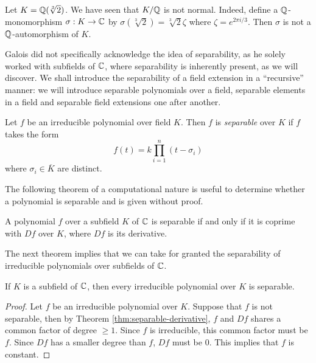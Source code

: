\begin{example}
	Let $K = \mathbb Q(\sqrt[3]{2})$. We have seen that $K / \mathbb Q$ is not normal. Indeed, define a $\mathbb Q$-monomorphism $\sigma : K \to \mathbb C$ by $\sigma(\sqrt[3]{2}) =  \sqrt[3]{2}\zeta $ where $\zeta = e^{2 \pi i / 3}$. Then $\sigma$ is not a $\mathbb Q$-automorphism of $K$. 
\end{example}



Galois did not specifically acknowledge the idea of separability, as he solely worked with subfields of $\mathbb C$, where separability is inherently present, as we will discover. We shall introduce the separability of a field extension in a ``recursive'' manner: we will introduce separable polynomials over a field, separable elements in a field and separable field extensions one after another. 

\begin{definition}
    Let $f$ be an irreducible polynomial over field $K$. Then $f$ is \textit{separable} over $K$ if $f$ takes the form 
    $$
        f(t) = k \prod_{i = 1} ^ n(t - \sigma_i)
    $$
    where $\sigma_i \in \overline K$ are distinct.
\end{definition}

The following theorem of a computational nature is useful to determine whether a polynomial is separable and is given without proof. 

\begin{theorem} \label{thm:separable-derivative}
    A polynomial $f$ over a subfield $K$ of $\mathbb C$ is separable if and only if it is coprime with $Df$ over $K$, where $Df$ is its derivative. 
\end{theorem}

The next theorem implies that we can take for granted the separability of irreducible polynomials over subfields of $\mathbb C$. 

\begin{theorem} \label{thm:separable-poly-in-C}
    If $K$ is a subfield of $\mathbb C$, then every irreducible polynomial over $K$ is separable. 
\end{theorem}

\begin{proof}
    Let $f$ be an irreducible polynomial over $K$. Suppose that $f$ is not separable, then by Theorem \ref{thm:separable-derivative}, $f$ and $Df$ shares a common factor of degree $\ge 1$. Since $f$ is irreducible, this common factor must be $f$. Since $Df$ has a smaller degree than $f$, $Df$ must be $0$. This implies that $f$ is constant.
\end{proof}

